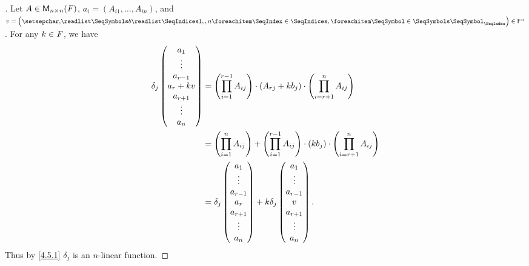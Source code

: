 \begin{proof}[]
  Let \(A \in \mathsf{M}_{{n} \times n}({\mathit{F}})\), \(a_i = (A_{i 1}, \dots, A_{i n})\), and \(v = \tuple{b}{1,,n} \in \vs{F}^n\).
  For any \(k \in \mathit{F}\), we have
  \begin{align*}
    \delta_j\begin{pmatrix}
              a_1       \\
              \vdots    \\
              a_{r - 1} \\
              a_r + kv  \\
              a_{r + 1} \\
              \vdots    \\
              a_n
            \end{pmatrix} & = \left\lparen\prod_{i = 1}^{r - 1} A_{i j}\right\rparen \cdot (A_{r j} + k b_j) \cdot \left\lparen\prod_{i = r + 1}^n A_{i j}\right\rparen                        \\
                            & = \left\lparen\prod_{i = 1}^n A_{i j}\right\rparen + \left\lparen\prod_{i = 1}^{r - 1} A_{i j}\right\rparen \cdot (k b_j) \cdot \left\lparen\prod_{i = r + 1}^n A_{i j}\right\rparen \\
                            & = \delta_j\begin{pmatrix}
                                          a_1       \\
                                          \vdots    \\
                                          a_{r - 1} \\
                                          a_r       \\
                                          a_{r + 1} \\
                                          \vdots    \\
                                          a_n
                                        \end{pmatrix} + k \delta_j\begin{pmatrix}
                                                                    a_1       \\
                                                                    \vdots    \\
                                                                    a_{r - 1} \\
                                                                    v         \\
                                                                    a_{r + 1} \\
                                                                    \vdots    \\
                                                                    a_n
                                                                  \end{pmatrix}.
  \end{align*}
  Thus by \cref{4.5.1} \(\delta_j\) is an \(n\)-linear function.
\end{proof}

